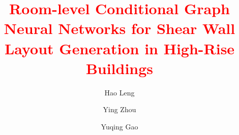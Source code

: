 \documentclass[final,5p,times,twocolumn, fleqn]{elsarticle}
\begin{document}
\setlength{\abovedisplayskip}{5pt}
\setlength{\belowdisplayskip}{5pt}

\begin{frontmatter}



\title{\textcolor{red}{Room-level Conditional Graph Neural Networks for Shear Wall Layout Generation in High-Rise Buildings}}


\author{Hao Leng}
\author{Ying Zhou}
\author{Yuqing Gao}

\address{State Key Laboratory of Disaster Reduction in Civil Engineering, Tongji University, Shanghai 200092, China}




\end{frontmatter}
\end{document}
